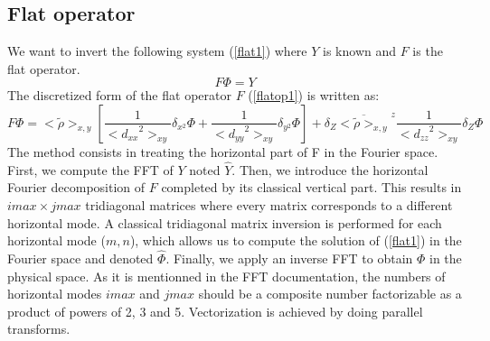 \subsection{Flat operator}
\par We want to invert the following system (\ref{flat1}) where $Y$ is known
and $F$ is the flat operator.
\begin{equation}
\label{flat1}
F \Phi = Y
\end{equation}
The discretized form of the flat operator $F$ (\ref{flatop1})  is written as:
\begin{equation}
\label{flatop2}
F \Phi = <\tilde{\rho}>_{x, y} \left[ \dfrac {1} {<{d_{xx}}^2>_{xy}} \delta _{x^2}
 \Phi
+ \dfrac{1}{<{d_{yy}}^2>_{xy}}\delta _{y^2} \Phi \right]
+ \delta _{Z}  \overline{<\tilde{\rho} >_{x, y}}^{z} \dfrac {1}
{<{d_{zz}}^2>_{xy} } \delta _{Z}\Phi
\end{equation}
The method consists in treating the horizontal part of F in the Fourier space.
First, we compute the FFT of $Y$ noted $\hat{Y}$. Then, we introduce the
horizontal Fourier decomposition of $F$ completed by its classical vertical
part. This results in $imax \times jmax$ tridiagonal matrices where every
matrix corresponds to a different horizontal mode. A classical tridiagonal
matrix inversion is performed for each horizontal mode ($m, n$), which allows
us to compute the solution of (\ref{flat1}) in the Fourier space and denoted
$\hat{\Phi}$. Finally, we apply an inverse FFT to obtain $\Phi$ in the physical
space. As it is mentionned in the FFT documentation, the numbers of horizontal
modes $imax$ and $jmax$ should be a composite number
factorizable as a product of powers of 2, 3 and 5. Vectorization is achieved by
doing parallel transforms.
